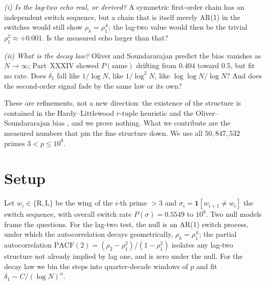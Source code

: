 \documentclass[11pt]{article}
\begin{document}
\emph{(i) Is the lag-two echo real, or derived?} A symmetric first-order chain has an independent switch
sequence, but a chain that is itself merely AR(1) in the switches would still show
$\rho_k=\rho_1^{\,k}$; the lag-two value would then be the trivial $\rho_1^2\approx+0.001$. Is the
measured echo larger than that?

\emph{(ii) What is the decay law?} Oliver and Soundararajan \cite{OS} predict the bias vanishes as
$N\to\infty$; Part~XXXIV showed $P(\text{same})$ drifting from $0.404$ toward $0.5$, but fit no rate.
Does $\delta_1$ fall like $1/\log N$, like $1/\log^2 N$, like $\log\log N/\log N$? And does the
second-order signal fade by the same law or its own?

These are refinements, not a new direction: the existence of the structure is contained in the
Hardy--Littlewood $r$-tuple heuristic \cite{HL} and the Oliver--Soundararajan bias \cite{OS}, and we
prove nothing. What we contribute are the measured numbers that pin the fine structure down. We use all
$50{,}847{,}532$ primes $3<p\le10^{9}$.

\section{Setup}
Let $w_i\in\{\mathrm{R},\mathrm{L}\}$ be the wing of the $i$-th prime $>3$ and
$\sigma_i=\mathbf{1}[w_{i+1}\ne w_i]$ the switch sequence, with overall switch rate $P(\sigma)=0.5549$
to $10^{9}$. Two null models frame the questions. For the lag-two test, the null is an AR(1) switch
process, under which the autocorrelation decays geometrically, $\rho_k=\rho_1^{\,k}$; the partial
autocorrelation $\mathrm{PACF}(2)=(\rho_2-\rho_1^2)/(1-\rho_1^2)$ isolates any lag-two structure not
already implied by lag one, and is zero under the null. For the decay law we bin the steps into
quarter-decade windows of $p$ and fit $\delta_1\sim C/(\log N)^{\alpha}$.
\end{document}
